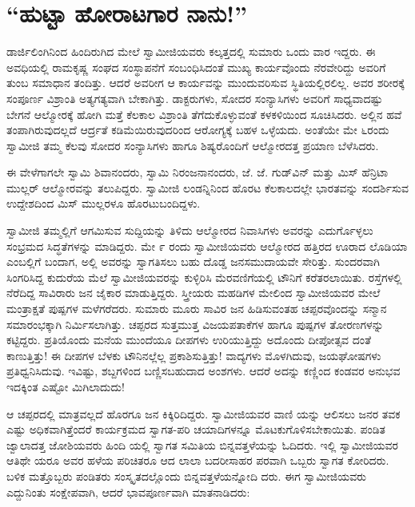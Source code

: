 
\chapter{“ಹುಟ್ಟಾ ಹೋರಾಟಗಾರ ನಾನು!”}

\noindent

ಡಾರ್ಜಿಲಿಂಗಿನಿಂದ ಹಿಂದಿರುಗಿದ ಮೇಲೆ ಸ್ವಾಮೀಜಿಯವರು ಕಲ್ಕತ್ತದಲ್ಲಿ ಸುಮಾರು ಒಂದು ವಾರ ಇದ್ದರು. ಈ ಅವಧಿಯಲ್ಲಿ ರಾಮಕೃಷ್ಣ ಸಂಘದ ಸಂಸ್ಥಾಪನೆಗೆ ಸಂಬಂಧಿಸಿದಂತೆ ಮುಖ್ಯ ಕಾರ್ಯವೊಂದು ನೆರವೇರಿದ್ದು ಅವರಿಗೆ ತುಂಬ ಸಮಾಧಾನ ತಂದಿತ್ತು. ಆದರೆ ಅವರೀಗ ಆ ಕಾರ್ಯವನ್ನು ಮುಂದುವರಿಸುವ ಸ್ಥಿತಿಯಲ್ಲಿರಲಿಲ್ಲ. ಅವರ ಶರೀರಕ್ಕೆ ಸಂಪೂರ್ಣ ವಿಶ್ರಾಂತಿ ಅತ್ಯಗತ್ಯವಾಗಿ ಬೇಕಾಗಿತ್ತು. ಡಾಕ್ಟರುಗಳು, ಸೋದರ ಸಂನ್ಯಾಸಿಗಳು ಅವರಿಗೆ ಸಾಧ್ಯವಾದಷ್ಟು ಬೇಗನೆ ಆಲ್ಮೋರಕ್ಕೆ ಹೋಗಿ ಮತ್ತೆ ಕೆಲಕಾಲ ವಿಶ್ರಾಂತಿ ತೆಗೆದುಕೊಳ್ಳುವಂತೆ ಕಳಕಳಿಯಿಂದ ಸೂಚಿಸಿದರು. ಅಲ್ಲಿನ ಹವೆ ತಂಪಾಗಿರುವುದಲ್ಲದೆ ಆರ್ದ್ರತೆ ಕಡಿಮೆಯಿರುವುದರಿಂದ ಆರೋಗ್ಯಕ್ಕೆ ಬಹಳ ಒಳ್ಳೆಯದು. ಅಂತೆಯೇ ಮೇ ೬ರಂದು ಸ್ವಾಮೀಜಿ ತಮ್ಮ ಕೆಲವು ಸೋದರ ಸಂನ್ಯಾಸಿಗಳು ಹಾಗೂ ಶಿಷ್ಯರೊಂದಿಗೆ ಆಲ್ಮೋರದತ್ತ ಪ್ರಯಾಣ ಬೆಳೆಸಿದರು.

ಈ ವೇಳೆಗಾಗಲೇ ಸ್ವಾಮಿ ಶಿವಾನಂದರು, ಸ್ವಾಮಿ ನಿರಂಜನಾನಂದರು, ಜೆ. ಜೆ. ಗುಡ್​ವಿನ್ ಮತ್ತು ಮಿಸ್ ಹೆನ್ರಿಟಾ ಮುಲ್ಲರ್ ಆಲ್ಮೋರವನ್ನು ತಲುಪಿದ್ದರು. ಸ್ವಾಮೀಜಿ ಲಂಡನ್ನಿನಿಂದ ಹೊರಟ ಕೆಲಕಾಲದಲ್ಲೇ ಭಾರತವನ್ನು ಸಂದರ್ಶಿಸುವ ಉದ್ದೇಶದಿಂದ ಮಿಸ್ ಮುಲ್ಲರಳೂ ಹೊರಟುಬಂದಿದ್ದಳು.

ಸ್ವಾಮೀಜಿ ತಮ್ಮಲ್ಲಿಗೆ ಆಗಮಿಸುವ ಸುದ್ದಿಯನ್ನು ತಿಳಿದು ಆಲ್ಮೋರದ ನಿವಾಸಿಗಳು ಅವರನ್ನು ಎದುರ್ಗೊಳ್ಳಲು ಸಂಭ್ರಮದ ಸಿದ್ಧತೆಗಳನ್ನು ಮಾಡಿದ್ದರು. ಮೇ ೯ ರಂದು ಸ್ವಾಮೀಜಿಯವರು ಆಲ್ಮೋರದ ಹತ್ತಿರದ ಊರಾದ ಲೊಡಿಯಾ ಎಂಬಲ್ಲಿಗೆ ಬಂದಾಗ, ಅಲ್ಲಿ ಅವರನ್ನು ಸ್ವಾಗತಿಸಲು ಬಹು ದೊಡ್ಡ ಜನಸಮುದಾಯವೇ ಸೇರಿತ್ತು. ಸುಂದರವಾಗಿ ಸಿಂಗರಿಸಿದ್ದ ಕುದುರೆಯ ಮೆಲೆ ಸ್ವಾಮೀಜಿಯವರನ್ನು ಕುಳ್ಳಿರಿಸಿ ಮೆರವಣಿಗೆಯಲ್ಲಿ ಟೌನಿಗೆ ಕರೆತರಲಾಯಿತು. ರಸ್ತೆಗಳಲ್ಲಿ ನೆರೆದಿದ್ದ ಸಾವಿರಾರು ಜನ ಜೈಕಾರ ಮಾಡುತ್ತಿದ್ದರು. ಸ್ತ್ರೀಯರು ಮಹಡಿಗಳ ಮೇಲಿಂದ ಸ್ವಾಮೀಜಿಯವರ ಮೇಲೆ ಮಂತ್ರಾಕ್ಷತೆ ಪುಷ್ಪಗಳ ಮಳೆಗರೆದರು. ಸುಮಾರು ಮೂರು ಸಾವಿರ ಜನ ಹಿಡಿಸುವಂತಹ ಚಪ್ಪರವೊಂದನ್ನು ಸನ್ಮಾನ ಸಮಾರಂಭಕ್ಕಾಗಿ ನಿರ್ಮಿಸಲಾಗಿತ್ತು. ಚಪ್ಪರದ ಸುತ್ತಮುತ್ತ ವಿಜಯಪತಾಕೆಗಳ ಹಾಗೂ ಪುಷ್ಪಗಳ ತೋರಣಗಳನ್ನು ಕಟ್ಟಿದ್ದರು. ಪ್ರತಿಯೊಂದು ಮನೆಯ ಮುಂದೆಯೂ ದೀಪಗಳು ಉರಿಯುತ್ತಿದ್ದು ಅದೊಂದು ದೀಪೋತ್ಸವ ದಂತೆ ಕಾಣುತ್ತಿತ್ತು! ಈ ದೀಪಗಳ ಬೆಳಕು ಟೌನಿನಲ್ಲೆಲ್ಲ ಪ್ರಕಾಶಿಸುತ್ತಿತ್ತು! ವಾದ್ಯಗಳು ಮೊಳಗಿದುವು, ಜಯಘೋಷಗಳು ಪ್ರತಿಧ್ವನಿಸಿದುವು. ಇವಿಷ್ಟು, ಶಬ್ದಗಳಿಂದ ಬಣ್ಣಿಸಬಹುದಾದ ಅಂಶಗಳು. ಆದರೆ ಅದನ್ನು ಕಣ್ಣಿಂದ ಕಂಡವರ ಅನುಭವ ಇದಕ್ಕಿಂತ ಎಷ್ಟೋ ಮಿಗಿಲಾದುದು!

ಆ ಚಪ್ಪರದಲ್ಲಿ ಮಾತ್ರವಲ್ಲದೆ ಹೊರಗೂ ಜನ ಕಿಕ್ಕಿರಿದಿದ್ದರು. ಸ್ವಾಮೀಜಿಯವರ ವಾಣಿ ಯನ್ನು ಆಲಿಸಲು ಜನರ ತವಕ ಎಷ್ಟು ಅಧಿಕವಾಗಿತ್ತೆಂದರೆ ಕಾರ್ಯಕ್ರಮದ ಸ್ವಾಗತ-ಪರಿ ಚಯಾದಿಗಳನ್ನೂ ಮೊಟಕುಗೊಳಿಸಬೇಕಾಯಿತು. ಪಂಡಿತ ಜ್ವಾಲಾದತ್ತ ಜೋಶಿಯವರು ಹಿಂದಿ ಯಲ್ಲಿ ಸ್ವಾಗತ ಸಮಿತಿಯ ಬಿನ್ನವತ್ತಳೆಯನ್ನು ಓದಿದರು. ಇಲ್ಲಿ ಸ್ವಾಮೀಜಿಯವರ ಆತಿಥೇ ಯರೂ ಅವರ ಹಳೆಯ ಪರಿಚಿತರೂ ಆದ ಲಾಲಾ ಬದರೀಸಾಹರ ಪರವಾಗಿ ಒಬ್ಬರು ಸ್ವಾಗತ ಕೋರಿದರು. ಬಳಿಕ ಮತ್ತೊಬ್ಬರು ಪಂಡಿತರು ಸಂಸ್ಕೃತದಲ್ಲೊಂದು ಬಿನ್ನವತ್ತಳೆಯನ್ನೋದಿ ದರು. ಈಗ ಸ್ವಾಮೀಜಿಯವರು ಎದ್ದುನಿಂತು ಸಂಕ್ಷೇಪವಾಗಿ, ಆದರೆ ಭಾವಪೂರ್ಣವಾಗಿ ಮಾತನಾಡಿದರು:

